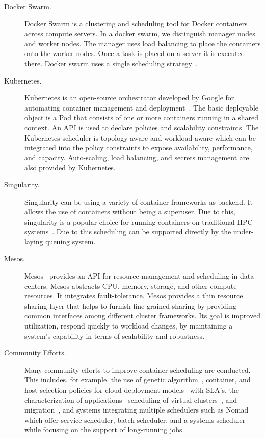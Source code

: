 \documentclass[final,5p,times,twocolumn]{elsarticle}
\begin{document}
\begin{description}


\item[Docker Swarm.] Docker Swarm is a clustering and scheduling tool for Docker containers~\cite{Dockerswarmengine2018} across compute servers. In a docker swarm, we distinguish manager nodes and worker nodes. The manager uses load balancing to place the containers onto the worker nodes. Once a task is placed on a server it is executed there. Docker swarm uses a single scheduling strategy~\cite{Dockerswarm2018}.



\item[Kubernetes.] Kubernetes is an open-source orchestrator developed by Google for automating container management and deployment~\cite{Kubernates2018}. The basic deployable object is a Pod that consists of one or more containers running in a shared context. An API is used to declare policies and scalability constraints. The Kubernetes scheduler is topology-aware and workload aware which can be integrated into the policy constraints to expose availability, performance, and capacity. Auto-scaling, load balancing, and secrets management are also provided by Kubernetes.

\item[Singularity.] Singularity can be using a variety of container frameworks as backend. It allows the use of containers without being a superuser. Due to this, singularity is a popular choice for running containers on traditional HPC systems~\cite{www-singularity}. Due to this scheduling can be supported directly by the under-laying queuing system.


\item[Mesos.] Mesos~\cite{hindman2011mesos,Mesos2018} provides an API for resource management and scheduling in data centers. Mesos abstracts CPU, memory, storage, and other compute resources. It integrates fault-tolerance. Mesos provides a thin resource sharing layer that helps to furnish fine-grained sharing by providing common interfaces among different cluster frameworks. Its goal is improved utilization, respond quickly to workload changes, by maintaining a system's capability in terms of scalability and robustness.


\item[Community Efforts.] Many community efforts to improve container scheduling are conducted. This includes, for example, the use of genetic algorithm~\cite{guerrero2018genetic}, container, and host selection policies for cloud deployment models~\cite{hanafy2017novel} with SLA's, the characterization of applications~\cite{medel2017client} scheduling of virtual clusters~\cite{dziurzanskivalue}, and migration~\cite{Flocker2018}, and systems integrating multiple schedulers such as Nomad which offer service scheduler, batch scheduler, and a systems scheduler while focusing on the support of long-running jobs~\cite{Nomad2018}.

\end{description}
\end{document}
